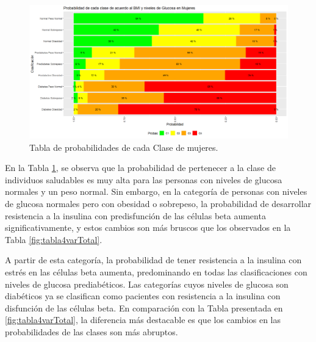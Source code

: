 \begin{figure}[H]
    \centering
    \includegraphics[height = 10 cm, width = 0.9 \textwidth]{4img/tablaM.png}
    \caption{Tabla de probabilidades de cada Clase de mujeres.}
    \label{fig:tabMujeres}
\end{figure}

En la Tabla \ref{fig:tabMujeres}, se observa que la probabilidad de pertenecer a la clase de individuos saludables es muy alta para las personas con niveles de glucosa normales y un peso normal. Sin embargo, en la categoría de personas con niveles de glucosa normales pero con obesidad o sobrepeso, la probabilidad de desarrollar resistencia a la insulina con predisfunción de las células beta aumenta significativamente, y estos cambios son más bruscos que los observados en la Tabla \ref{fig:tabla4varTotal}.

A partir de esta categoría, la probabilidad de tener resistencia a la insulina con estrés en las células beta aumenta, predominando en todas las clasificaciones con niveles de glucosa prediabéticos. Las categorías cuyos niveles de glucosa son diabéticos ya se clasifican como pacientes con resistencia a la insulina con disfunción de las células beta. En comparación con la Tabla presentada en  \ref{fig:tabla4varTotal}, la diferencia más destacable es que los cambios en las probabilidades de las clases son más abruptos. 



